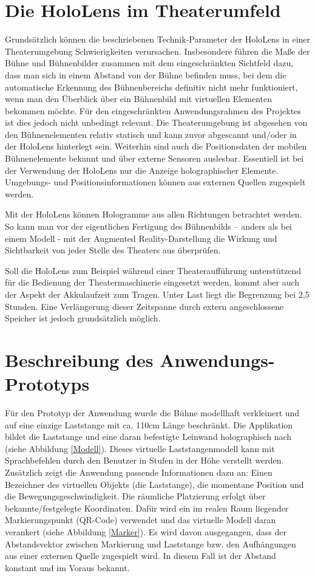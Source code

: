 \documentclass[conference, 11pt]{IEEEtran}
\begin{document}
\section{Die HoloLens im Theaterumfeld}
Grundsätzlich können die beschriebenen Technik-Parameter der HoloLens in einer Theaterumgebung Schwierigkeiten verursachen. Insbesondere führen die Maße der Bühne und Bühnenbilder zusammen mit dem eingeschränkten Sichtfeld dazu, dass man sich in einem Abstand von der Bühne befinden muss, bei dem die automatische Erkennung des Bühnenbereichs definitiv nicht mehr funktioniert, wenn man den Überblick über ein Bühnenbild mit virtuellen Elementen bekommen möchte. Für den eingeschränkten Anwendungsrahmen des Projektes ist dies jedoch nicht unbedingt relevant. Die Theaterumgebung ist abgesehen von den Bühnenelementen relativ statisch und kann zuvor abgescannt und/oder in der HoloLens hinterlegt sein. Weiterhin sind auch die Positionsdaten der mobilen Bühnenelemente bekannt und über externe Sensoren auslesbar. Essentiell ist bei der Verwendung der HoloLens nur die Anzeige holographischer Elemente. Umgebungs- und Positionsinformationen können aus externen Quellen zugespielt werden. \par
Mit der HoloLens können Hologramme aus allen Richtungen betrachtet werden. So kann man vor der eigentlichen Fertigung des Bühnenbilds – anders als bei einem Modell - mit der Augmented Reality-Darstellung die Wirkung und Sichtbarkeit von jeder Stelle des Theaters aus überprüfen.\par
Soll die HoloLens zum Beispiel während einer Theateraufführung unterstützend für die Bedienung der Theatermaschinerie eingesetzt werden, kommt aber auch der Aspekt der Akkulaufzeit zum Tragen. Unter Last liegt die Begrenzung bei 2,5 Stunden. Eine Verlängerung dieser Zeitspanne durch extern angeschlossene Speicher ist jedoch grundsätzlich möglich. 



\section{Beschreibung des Anwendungs-Prototyps}
Für den Prototyp der Anwendung wurde die Bühne modellhaft verkleinert und auf eine einzige Laststange mit ca. 110cm Länge beschränkt. Die Applikation bildet die Laststange und eine daran befestigte Leinwand holographisch nach (siehe Abbildung \ref{Modell}). Dieses virtuelle Laststangenmodell kann mit Sprachbefehlen durch den Benutzer in Stufen in der Höhe verstellt werden. Zusätzlich zeigt die Anwendung passende Informationen dazu an: Einen Bezeichner des virtuellen Objekts (die  Laststange), die momentane Position und die Bewegungsgeschwindigkeit. Die räumliche Platzierung erfolgt über bekannte/festgelegte Koordinaten. Dafür wird ein im realen Raum liegender Markierungspunkt (QR-Code) verwendet und das virtuelle Modell daran verankert (siehe Abbildung \ref{Marker}). Es wird davon ausgegangen, dass der Abstandsvektor zwischen Markierung und Laststange bzw. den Aufhängungen aus einer externen Quelle zugespielt wird. In diesem Fall ist der Abstand konstant und im Voraus bekannt. \par
\end{document}

